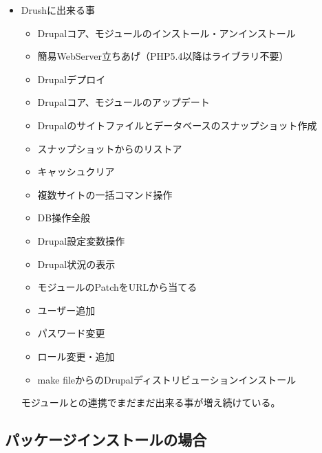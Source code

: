 \documentclass[mingoth,a4paper]{jsarticle}
\begin{document}
\begin{enumerate}
\begin{itemize}
\item Drushに出来る事
  \begin{itemize}
  \item Drupalコア、モジュールのインストール・アンインストール
  \item 簡易WebServer立ちあげ（PHP5.4以降はライブラリ不要）
  \item Drupalデプロイ
  \item Drupalコア、モジュールのアップデート
  \item Drupalのサイトファイルとデータベースのスナップショット作成
  \item スナップショットからのリストア
  \item キャッシュクリア
  \item 複数サイトの一括コマンド操作
  \item DB操作全般
  \item Drupal設定変数操作
  \item Drupal状況の表示
  \item モジュールのPatchをURLから当てる
  \item ユーザー追加
  \item パスワード変更
  \item ロール変更・追加
  \item make fileからのDrupalディストリビューションインストール
  \end{itemize}

  モジュールとの連携でまだまだ出来る事が増え続けている。
\end{itemize}
\end{enumerate}

\subsection{パッケージインストールの場合}
\end{document}
